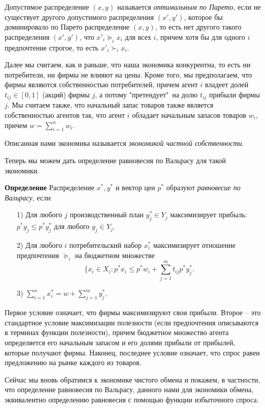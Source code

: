 Допустимое распределение $(x,y)$ называется \emph{оптимальным по Парето},
если не существует другого допустимого распределения $(x\prime,y\prime)$, которое бы
доминировало по Парето распределение $(x,y)$, то есть нет другого такого распределения
$(x\prime,y\prime)$, что $x\prime_i\succeq_ix_i$ для всех $i$, причем хотя бы для одного
$i$ предпочтение строгое, то есть $x\prime_i\succ_ix_i$.

Далее мы считаем, как и раньше, что наша экономика конкурентна, то есть
ни потребители, ни фирмы не влияют на цены. Кроме того, мы предполагаем, что фирмы
являются собственностью потребителей, причем агент $i$ владеет долей $t_{ij}\in[0,1]$ (акций)
фирмы $j$, а потому "претендует"\, на долю $t_{ij}$ прибыли фирмы $j$. Мы считаем также,
что начальный запас товаров также является собственностью агентов так, что агент $i$
обладает начальным запасов товаров $w_i$, причем $w=\sum^n_{i=1}w_i$.

Описанная нами экономика называется \emph{экономикой частной собственности}.

Теперь мы можем дать определение равновесия по Вальрасу для такой экономики.

\textbf{Определение} Распределение $x^*,y^*$ и вектор цен $p^*$ образуют \emph{равновесие
по Вальрасу}, если

\begin{itemize}
\item[1)] Для любого $j$ производственный план $y^*_j\in Y_j$ максимизирует прибыль:
$p^*y_j\leq p^*y^*_j$ для любого $y_j\in Y_j.$
\item[2)] Для любого $i$ потребительский набор $x^*_i$ максимизирует отношение предпочтения
$\succeq_i$ на бюджетном множестве
$$\{x_i\in X_i: p^*x_i\leq p^*w_i+\sum^m_{j=1}t_{ij}p^*y^*_j.$$
\item[3)] $\sum^n_{i=1}x^*_i=w+\sum^m_{j=1}y^*_j.$
\end{itemize}

Первое условие означает, что фирмы максимизируют свои прибыли. Второе -- это стандартное условие
максимизации полезности (если предпочтения описываются в терминах функции полезности), причем
бюджетное множество агента определяется его начальным запасом и его долями прибыли от прибылей,
которые получают фирмы. Наконец, последнее условие означает, что спрос равен предложению
на рынке каждого из товаров.

Сейчас мы вновь обратимся к экономике чистого обмена и покажем, в частности, что определение
равновесия по Вальрасу, данного нами  для экономики обмена, эквивалентно определению
равновесия с помощью функции избыточного спроса.

